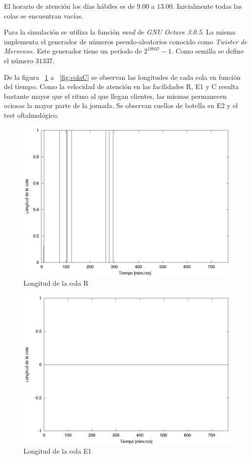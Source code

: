 \documentclass[a4paper,10pt]{article}
\begin{document}
El horario de atenci\'on los d\'ias h\'abiles es de $9.00$ a $13.00$. 
Inicialmente todas las colas se encuentran vac\'ias.
 

Para la simulaci\'on se utiliza la funci\'on \textit{rand} de 
\textit{GNU Octave 3.0.5}. La misma implementa el generador de n\'umeros
pseudo-aleatorios conocido como \textit{Twister de Mersenne}. Este generador
tiene un per\'iodo de $2^{19937} - 1$. Como semilla se define el n\'umero
$31337$.


De la figura  ~\ref{fig:colaR} a  ~\ref{fig:colaC} se observan las longitudes
de cada cola en funci\'on del tiempo. Como la velocidad de atenci\'on en las
facilidades R, E1 y C resulta bastante mayor que el ritmo al que llegan
clientes, las mismas permanecen ociosas la mayor parte de la jornada.
Se observan cuellos de botella en E2 y el test oftalmol\'ogico.

\begin{figure}[hp]
\centering
\includegraphics{graficos/plot_longitud_R.eps}
\caption{Longitud de la cola R}
\label{fig:colaR}
\end{figure}

\begin{figure}[hp]
\centering
\includegraphics{graficos/plot_longitud_E1.eps}
\caption{Longitud de la cola E1}
\label{fig:colaE1}
\end{figure}
\end{document}
